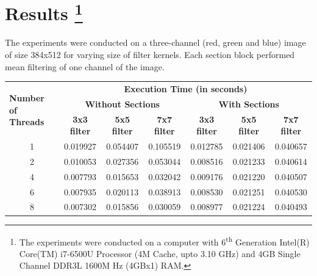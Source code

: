 \documentclass{article}
\begin{document}
	\section{Results \protect\footnote{The experiments were conducted on a computer with 6\textsuperscript{th} Generation Intel(R) Core(TM) i7-6500U Processor (4M Cache, upto 3.10 GHz) and 4GB Single Channel DDR3L 1600M Hz (4GBx1) RAM.}}
	
		The experiments were conducted on a three-channel (red, green and blue) image of size 384x512 for varying size of filter kernels. Each section block performed mean filtering of one channel of the image.

	
\begin{table}[!htbp]
\begin{tabular}{|c|c|c|c|c|c|c|}
\hline
\multicolumn{1}{|l|}{\multirow{3}{*}{\textbf{Number of Threads}}} & \multicolumn{6}{c|}{\textbf{Execution Time (in seconds)}}                                                                         \\ \cline{2-7} 
\multicolumn{1}{|l|}{}                                            & \multicolumn{3}{c|}{\textbf{Without Sections}}                  & \multicolumn{3}{c|}{\textbf{With Sections}}                     \\ \cline{2-7} 
\multicolumn{1}{|l|}{}                                            & \textbf{3x3 filter} & \textbf{5x5 filter} & \textbf{7x7 filter} & \textbf{3x3 filter} & \textbf{5x5 filter} & \textbf{7x7 filter} \\ \hline
1                                                                 & 0.019927            & 0.054407            & 0.105519            & 0.012785            & 0.021406            & 0.040657            \\ \hline
2                                                                 & 0.010053            & 0.027356            & 0.053044            & 0.008516            & 0.021233            & 0.040614            \\ \hline
4                                                                 & 0.007793            & 0.015653            & 0.032042            & 0.009176            & 0.021220            & 0.040507            \\ \hline
6                                                                 & 0.007935            & 0.020113            & 0.038913            & 0.008530            & 0.021251            & 0.040530            \\ \hline
8                                                                 & 0.007302            & 0.015856            & 0.030059            & 0.008977            & 0.021224            & 0.040493            \\ \hline

\end{tabular}
\end{table}
\end{document}
